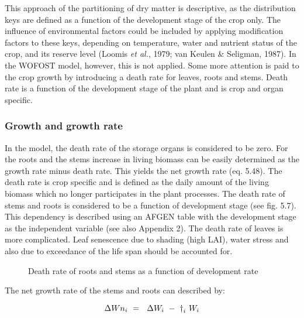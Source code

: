 This approach of the partitioning of dry mat\-ter is descriptive, as the distribution keys are
defined as a function of the development stage of the crop only. The influence of
environmental factors could be included by applying modification factors to these keys,
depending on temperature, water and nutrient status of the crop, and its reserve level
(Loomis {\it et al.}, 1979; van Keulen \& Seligman, 1987). In the WOFOST model, however,
this is not applied. Some more attention is paid to the crop growth by introducing a death
rate for leaves, roots and stems. Death rate is a function of the development stage of the
plant and is crop and organ specific.

\subsubsection{Growth and growth rate}
In the model, the death rate of the storage organs is considered to be zero. For the roots
and the stems increase in living biomass can be easily determined as the growth rate
minus death rate. This yields the net growth rate (eq. 5.48). The death rate is crop
specific and is defined as the daily amount of the living biomass which no longer
participates in the plant processes. The death rate of stems and roots is considered to be a
function of development stage (see fig. 5.7). This dependency is described using an
AFGEN table with the development stage as the independent variable (see also Appendix
2). The death rate of leaves is more complicat\-ed. Leaf senescence due to shading (high
LAI), water stress and also due to exceedance of the life span should be accounted for.


\begin{figure}[htbp]
\caption{Death rate of roots and stems as a function of development rate}
\label{fig:DeathRoots}
\begin{forcewidth}{10.05cm}
 \begin{center} \end{center}
\end{forcewidth}
\end{figure}


The net growth rate of the stems and roots can described by:

\begin{equation}
\Delta Wn _{i~} =~\,\,\Delta W _{i~} -~ {\rm \dag } _{i} \,\, W _{i} 
\end{equation}

